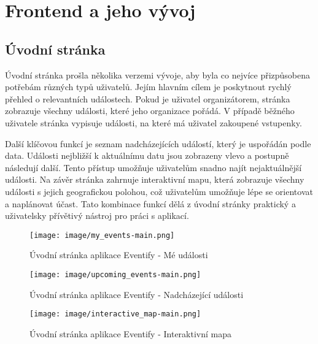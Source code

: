 \documentclass[12pt, a4paper,
twoside,        %
openright
]{report}
\begin{document}
\chapter{Frontend a jeho vývoj}

	\section{Úvodní stránka}
		
	Úvodní stránka prošla několika verzemi vývoje, aby byla co nejvíce přizpůsobena potřebám různých typů uživatelů. Jejím hlavním cílem je poskytnout rychlý přehled o relevantních událostech. Pokud je uživatel organizátorem, stránka zobrazuje všechny události, které jeho organizace pořádá. V případě běžného uživatele stránka vypisuje události, na které má uživatel zakoupené vstupenky.
	
	Další klíčovou funkcí je seznam nadcházejících událostí, který je uspořádán podle data. Události nejbližší k aktuálnímu datu jsou zobrazeny vlevo a postupně následují další. Tento přístup umožňuje uživatelům snadno najít nejaktuálnější události. Na závěr stránka zahrnuje interaktivní mapu, která zobrazuje všechny události s jejich geografickou polohou, což uživatelům umožňuje lépe se orientovat a naplánovat účast. Tato kombinace funkcí dělá z úvodní stránky praktický a uživatelsky přívětivý nástroj pro práci s aplikací.
	
	\begin{figure}[h!]
		\centering %
		\texttt{[image: image/my\_events-main.png]} %
		\caption{Úvodní stránka aplikace Eventify - Mé události} %
		\label{fig:myevents} %
	\end{figure}
	
	\begin{figure}[h!]
		\centering %
		\texttt{[image: image/upcoming\_events-main.png]} %
		\caption{Úvodní stránka aplikace Eventify - Nadcházející události} %
		\label{fig:upcomingevents} %
	\end{figure}
	
	\begin{figure}[h!]
		\centering %
		\texttt{[image: image/interactive\_map-main.png]} %
		\caption{Úvodní stránka aplikace Eventify - Interaktivní mapa} %
		\label{fig:interactivemap} %
	\end{figure}
	
\end{document}
